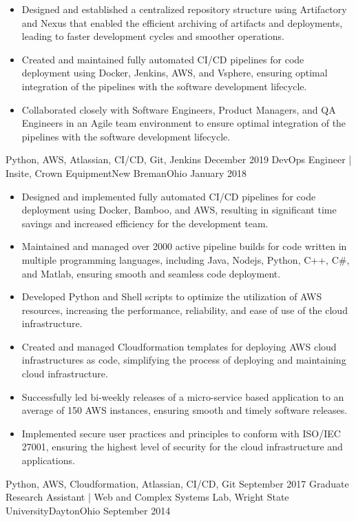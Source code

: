 \begin{experiences}
{\begin{itemize}
          \item Designed and established a centralized repository structure using Artifactory and Nexus that enabled the efficient archiving of artifacts and deployments, leading to faster development cycles and smoother operations.
          \item Created and maintained fully automated CI/CD pipelines for code deployment using Docker, Jenkins, AWS, and Vsphere, ensuring optimal integration of the pipelines with the software development lifecycle.
          \item Collaborated closely with Software Engineers, Product Managers, and QA Engineers in an Agile team environment to ensure optimal integration of the pipelines with the software development lifecycle.
      \end{itemize}
  }
  {Python, AWS, Atlassian, CI/CD, Git, Jenkins}
  \emptySeparator
  \experience
    {December 2019}   {DevOps Engineer | Insite, Crown Equipment}{New Breman}{Ohio}
    {January 2018} {
      \begin{itemize}

          \item Designed and implemented fully automated CI/CD pipelines for code deployment using Docker, Bamboo, and AWS, resulting in significant time savings and increased efficiency for the development team.
          \item Maintained and managed over 2000 active pipeline builds for code written in multiple programming languages, including Java, Nodejs, Python, C++, C\#, and Matlab, ensuring smooth and seamless code deployment.
          \item Developed Python and Shell scripts to optimize the utilization of AWS resources, increasing the performance, reliability, and ease of use of the cloud infrastructure.
          \item Created and managed Cloudformation templates for deploying AWS cloud infrastructures as code, simplifying the process of deploying and maintaining cloud infrastructure.
          \item Successfully led bi-weekly releases of a micro-service based application to an average of 150 AWS instances, ensuring smooth and timely software releases.
          \item Implemented secure user practices and principles to conform with ISO/IEC 27001, ensuring the highest level of security for the cloud infrastructure and applications.
      \end{itemize}
  }
  {Python, AWS, Cloudformation, Atlassian, CI/CD, Git}
  \emptySeparator
  \experience
    {September 2017}   {Graduate Research Assistant | Web and Complex Systems Lab, Wright State University}{Dayton}{Ohio}
    {September 2014} {
      \begin{itemize}


\end{itemize}}
\end{experiences}
